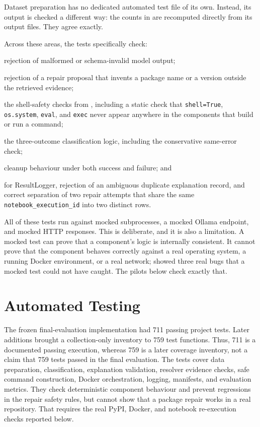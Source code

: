 Dataset preparation has no dedicated automated test file of its own.
Instead, its output is checked a different way: the counts in
 are recomputed directly from its output
files. They agree exactly.

Across these areas, the tests specifically check:

\begin{itemize}
\begin{sloppypar}
  \item rejection of malformed or schema-invalid model output;
  \item rejection of a repair proposal that invents a package name or a
        version outside the retrieved evidence;
  \item the shell-safety checks from , including a
        static check that \texttt{shell=True}, \texttt{os.system},
        \texttt{eval}, and \texttt{exec} never appear anywhere in the
        components that build or run a command;
  \item the three-outcome classification logic, including the
        conservative same-error check;
  \item cleanup behaviour under both success and failure; and
  \item for ResultLogger, rejection of an ambiguous duplicate explanation
        record, and correct separation of two repair attempts that share
        the same \texttt{notebook\_execution\_id} into two distinct rows.
\end{sloppypar}
\end{itemize}

All of these tests run against mocked subprocesses, a mocked Ollama
endpoint, and mocked HTTP responses. This is deliberate, and it is also a
limitation. A mocked test can prove that a component's logic is internally
consistent. It cannot prove that the component behaves correctly against
a real operating system, a running Docker environment, or a real network;
 showed three real bugs that a mocked test could
not have caught. The pilots below check exactly that.

\fi

\section{Automated Testing}
\label{sec:v-testing-current}
\label{sec:v-testing}

The frozen final-evaluation implementation had 711 passing project tests.
Later additions brought a collection-only inventory to 759 test functions.
Thus, 711 is a documented passing execution, whereas 759 is a later coverage
inventory, not a claim that 759 tests passed in the final evaluation. The tests
cover data preparation, classification, explanation validation, resolver
evidence checks, safe command construction, Docker orchestration, logging,
manifests, and evaluation metrics. They check deterministic component behaviour
and prevent regressions in the repair safety rules, but cannot show that a
package repair works in a real repository. That requires the real PyPI, Docker,
and notebook re-execution checks reported below.

